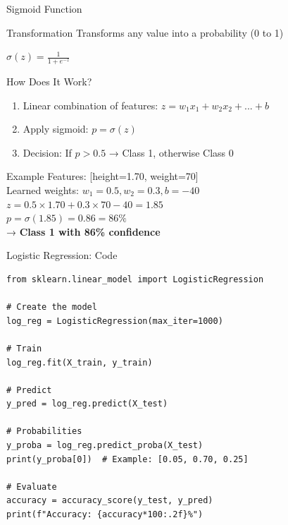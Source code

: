 \documentclass[aspectratio=169]{beamer}
\begin{document}
\begin{frame}{Sigmoid Function}
\begin{block}{Transformation}
Transforms any value into a probability (0 to 1)
\end{block}

\vspace{0.3cm}
\begin{center}
\Large
$\sigma(z) = \frac{1}{1 + e^{-z}}$
\end{center}

\vspace{0.3cm}
\begin{center}
\end{center}
\end{frame}

\begin{frame}{How Does It Work?}
\begin{enumerate}
    \item Linear combination of features: $z = w_1x_1 + w_2x_2 + ... + b$
    \item Apply sigmoid: $p = \sigma(z)$
    \item Decision: If $p > 0.5$ → Class 1, otherwise Class 0
\end{enumerate}

\vspace{0.5cm}
\begin{exampleblock}{Example}
Features: [height=1.70, weight=70]\\
Learned weights: $w_1=0.5, w_2=0.3, b=-40$\\
$z = 0.5 \times 1.70 + 0.3 \times 70 - 40 = 1.85$\\
$p = \sigma(1.85) = 0.86 = 86\%$\\
→ \textbf{Class 1 with 86\% confidence}
\end{exampleblock}
\end{frame}

\begin{frame}[fragile]{Logistic Regression: Code}
\begin{lstlisting}
from sklearn.linear_model import LogisticRegression

# Create the model
log_reg = LogisticRegression(max_iter=1000)

# Train
log_reg.fit(X_train, y_train)

# Predict
y_pred = log_reg.predict(X_test)

# Probabilities
y_proba = log_reg.predict_proba(X_test)
print(y_proba[0])  # Example: [0.05, 0.70, 0.25]

# Evaluate
accuracy = accuracy_score(y_test, y_pred)
print(f"Accuracy: {accuracy*100:.2f}%")
\end{lstlisting}
\end{frame}
\end{document}
